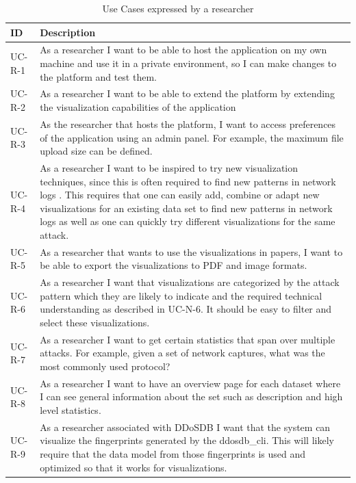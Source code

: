\begin{table}[]
\centering
\begin{tabular}{|p{1.6cm}|p{12cm}|}
\hline
\textbf{ID} & \textbf{Description} \\ \hline

UC-R-1        & As a researcher I want to be able to host the application on my own machine and use it in a private environment, so I can make changes to the platform and test them.\\ \hline
UC-R-2         & As a researcher I want to be able to extend the platform by extending the visualization capabilities of the application\\ \hline
UC-R-3        & As the researcher that hosts the platform, I want to access preferences of the application using an admin panel. For example, the maximum file upload size can be defined.\\ \hline
UC-R-4       & As a researcher I want to be inspired to try new visualization techniques, since this is often required to find new patterns in network logs \cite{appliedsecurityvisualization}. This requires that one can easily add, combine or adapt new visualizations for an existing data set to find new patterns in network logs as well as one can quickly try different visualizations for the same attack.\\ \hline
UC-R-5       & As a researcher that  wants to use the visualizations in papers, I want to be able to export the visualizations to PDF and image formats.\\ \hline
UC-R-6       & As a researcher I want that visualizations are categorized by the attack pattern which they are likely to indicate and the required technical understanding as described in UC-N-6. It should be easy to filter and select these visualizations.\\ \hline
UC-R-7      & As a researcher I want to get certain statistics that span over multiple attacks. For example, given a set of network captures, what was the most commonly used protocol?\\ \hline
UC-R-8      & As a researcher I want to have an overview page for each dataset where I can see general information about the set such as description and high level statistics.\\ \hline
UC-R-9     & As a researcher associated with DDoSDB I want that the system can visualize the fingerprints generated by the ddosdb\_cli. This will likely require that the data model from those fingerprints is used and optimized so that it works for visualizations. \\ \hline
\end{tabular}
\caption{Use Cases expressed by a researcher}
\label{table:us-researcher}
\end{table} 

